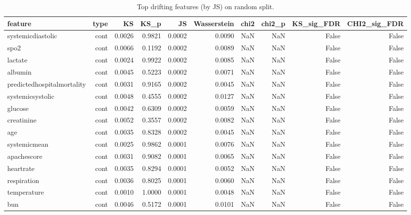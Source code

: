 \begin{table}
\caption{Top drifting features (by JS) on random split.}
\label{tab:topdrifting-random}
\begin{tabular}{lrrrrrrrrr}
\toprule
feature & type & KS & KS\_p & JS & Wasserstein & chi2 & chi2\_p & KS\_sig\_FDR & CHI2\_sig\_FDR \\
\midrule
systemicdiastolic & cont & 0.0026 & 0.9821 & 0.0002 & 0.0090 & NaN & NaN & False & False \\
spo2 & cont & 0.0066 & 0.1192 & 0.0002 & 0.0089 & NaN & NaN & False & False \\
lactate & cont & 0.0024 & 0.9922 & 0.0002 & 0.0085 & NaN & NaN & False & False \\
albumin & cont & 0.0045 & 0.5223 & 0.0002 & 0.0071 & NaN & NaN & False & False \\
predictedhospitalmortality & cont & 0.0031 & 0.9165 & 0.0002 & 0.0045 & NaN & NaN & False & False \\
systemicsystolic & cont & 0.0048 & 0.4555 & 0.0002 & 0.0127 & NaN & NaN & False & False \\
glucose & cont & 0.0042 & 0.6309 & 0.0002 & 0.0059 & NaN & NaN & False & False \\
creatinine & cont & 0.0052 & 0.3557 & 0.0002 & 0.0082 & NaN & NaN & False & False \\
age & cont & 0.0035 & 0.8328 & 0.0002 & 0.0045 & NaN & NaN & False & False \\
systemicmean & cont & 0.0025 & 0.9862 & 0.0001 & 0.0076 & NaN & NaN & False & False \\
apachescore & cont & 0.0031 & 0.9082 & 0.0001 & 0.0065 & NaN & NaN & False & False \\
heartrate & cont & 0.0035 & 0.8294 & 0.0001 & 0.0052 & NaN & NaN & False & False \\
respiration & cont & 0.0036 & 0.8025 & 0.0001 & 0.0060 & NaN & NaN & False & False \\
temperature & cont & 0.0010 & 1.0000 & 0.0001 & 0.0048 & NaN & NaN & False & False \\
bun & cont & 0.0046 & 0.5172 & 0.0001 & 0.0101 & NaN & NaN & False & False \\
\bottomrule
\end{tabular}
\end{table}
